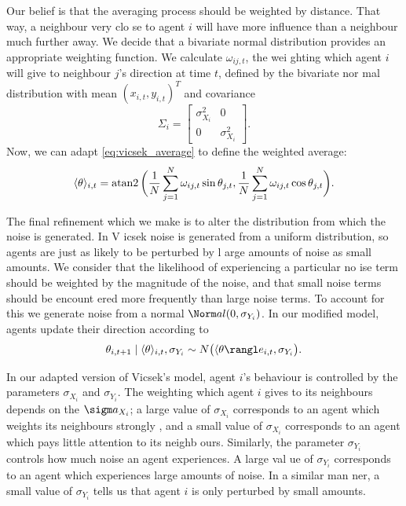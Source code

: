 Our belief is that the averaging process should be weighted by distance. That way, a neighbour very clo
se to agent $i$ will have more influence than a neighbour much further away. We decide that a bivariate
 normal distribution provides an appropriate weighting function. We calculate $\omega_{ij, t}$, the wei
ghting which agent $i$ will give to neighbour $j$'s direction at time $t$, defined by the bivariate nor
mal distribution with mean $(x_{i, t}, y_{i, t})^T$ and covariance
\[
	\Sigma_i = \begin{bmatrix}
		\sigma_{X_i}^2 & 0 \\
		0 & \sigma_{X_i}^2
	\end{bmatrix}.
\]
Now, we can adapt \cref{eq:vicsek_average} to define the weighted average:
\begin{equation}
\label{eq:weighted_average}
	\langle \theta \rangle_{i, t} = \operatorname{atan2} \bigg( \frac{1}{N} \sum_{j=1}^N \omega_{ij, t} \sin{\theta_{j
 ,t}}, \frac{1}{N} \sum_{j=1}^N \omega_{ij, t} \cos{\theta_{j, t}} \bigg).
\end{equation}

The final refinement which we make is to alter the distribution from which the noise is generated. In V
icsek noise is generated from a uniform distribution, so agents are just as likely to be perturbed by l
arge amounts of noise as small amounts. We consider that the likelihood of experiencing a particular no
ise term should be weighted by the magnitude of the noise, and that small noise terms should be encount
ered more frequently than large noise terms. To account for this we generate noise from a normal $\Norm
al(0, \sigma_{Y_i})$. In our modified model, agents update their direction according to
\begin{equation}
\label{eq:weighted_update}
	\theta_{i,t+1} \mid \langle \theta \rangle_{i, t}, \sigma_{Y_i} \sim \Normal\big(\langle \theta \rangl
e_{i, t}, \sigma_{Y_i}\big).
\end{equation}

In our adapted version of Vicsek's model, agent $i$'s behaviour is controlled by the parameters $\sigma
_{X_i}$ and $\sigma_{Y_i}$. The weighting which agent $i$ gives to its neighbours depends on the $\sigm
a_{X_i}$; a large value of $\sigma_{X_i}$ corresponds to an agent which weights its neighbours strongly
, and a small value of $\sigma_{X_i}$ corresponds to an agent which pays little attention to its neighb
ours. Similarly, the parameter $\sigma_{Y_i}$ controls how much noise an agent experiences. A large val
ue of $\sigma_{Y_i}$ corresponds to an agent which experiences large amounts of noise. In a similar man
ner, a small value of $\sigma_{Y_i}$ tells us that agent $i$ is only perturbed by small amounts.

